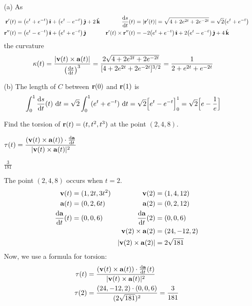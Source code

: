 \begin{solution} (a)
As
\begin{align*}
\vr'(t)&=\big(e^t + e^{-t}\big)\,\hi + \big(e^t - e^{-t}\big)\,\hj +2\,\hk &
\diff{s}{t}(t) &=|\vr'(t)|= \sqrt{4+2e^{2t}+2e^{-2t}}
                =\sqrt{2}\big(e^t+e^{-t}\big)\\
\vr''(t)&=\big(e^t - e^{-t}\big)\,\hi + \big(e^t + e^{-t}\big)\,\hj   &
\vr'(t)\times\vr''(t)&=-2\big(e^t + e^{-t}\big)\,\hi 
          + 2\big(e^t - e^{-t}\big)\,\hj +4\,\hk
\end{align*}
the curvature
\begin{align*}
\ka(t) &= \frac{|\vv(t)\times\va(t)|}{\big(\diff{s}{t}\big)^3}
 =\frac{2\sqrt{4+2e^{2t}+2e^{-2t}}}{[4+2e^{2t}+2e^{-2t}]^{3/2}}
 =\frac{1}{2+e^{2t}+e^{-2t}}
\end{align*}

(b) The length of $C$ between $\mathbf{r}(0)$ and $\mathbf{r}(1)$ is
\begin{align*}
\int_0^1 \diff{s}{t}(t) \ \dee{t}
&= \sqrt{2} \int_0^1 (e^t+e^{-t}) \ \dee{t}
=\sqrt{2}\Big[e^t-e^{-t}\Big]_0^1
=\sqrt{2}\Big[e-\frac{1}{e}\Big]
\end{align*}


\end{solution}
\begin{question}
	Find the torsion of $\mathbf{r}(t)=(t,t^2,t^3)$ at the point $(2,4,8)$.
\end{question}
\begin{hint}
	$\tau(t)=\dfrac{(\vv(t) \times \va(t))\cdot\diff{\va}{t}}{|\vv(t) \times \va(t)|^2}$
\end{hint}
\begin{answer}
$\frac{3}{{181}}$
\end{answer}
\begin{solution}
 The point $(2,4,8)$ occurs when $t=2$.
	\begin{align*}
		\vv(t)&=(1,2t,3t^2) & \vv(2)&=(1,4,12)\\
		\va(t)&=(0,2,6t) & \va(2)&=(0,2,12)\\
		\diff{\va}{t}(t)&=(0,0,6) & \diff{\va}{t}(2)&=(0,0,6)\\
		&& \vv(2) \times \va(2)&=(24,-12,2)\\
		&& |\vv(2) \times \va(2)|&=2\sqrt{181}
		\end{align*}
Now, we use a formula for torsion:
\begin{align*}\tau(t)&=\dfrac{(\vv(t) \times \va(t))\cdot\diff{\va}{t}(t)}{|\vv(t) \times \va(t)|^2}\\
\tau(2)&=\frac{(24,-12,2)\cdot(0,0,6)}{(2\sqrt{181})^2}=\frac{3}{{181}}
		\end{align*}
	
\end{solution}

